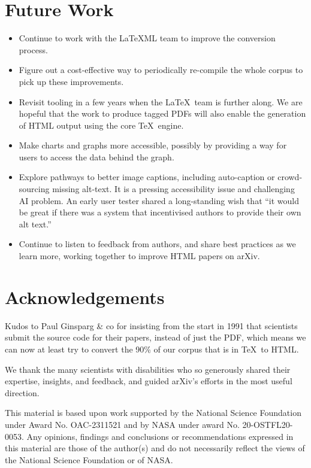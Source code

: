 \documentclass{easychair}
\begin{document}
\section{Future Work}
\label{sect:Future Work}

\begin{itemize}
    \item Continue to work with the LaTeXML team to improve the conversion process.
    \item Figure out a cost-effective way to periodically re-compile the whole corpus to pick up these improvements.
    \item Revisit tooling in a few years when the \LaTeX\ team is further along. We are hopeful that the work to produce tagged PDFs will also enable the generation of HTML output using the core \TeX\ engine.
    \item Make charts and graphs more accessible, possibly by providing a way for users to access the data behind the graph.
    \item Explore pathways to better image captions, including auto-caption or crowd-sourcing missing alt-text. It is a pressing accessibility issue and challenging AI problem. An early user tester shared a long-standing wish that ``it would be great if there was a system that incentivised authors to provide their own alt text.''
    \item Continue to listen to feedback from authors, and share best practices as we learn more, working together to improve HTML papers on arXiv.
\end{itemize}

\section{Acknowledgements}
\label{sect:Acknowledgements}

Kudos to Paul Ginsparg \& co for insisting from the start in 1991 that scientists submit the source code for their papers, instead of just the PDF, which means we can now at least try to convert the 90\% of our corpus that is in \TeX\ to HTML.

We thank the many scientists with disabilities who so generously shared their expertise, insights, and feedback, and guided arXiv's efforts in the most useful direction.

This material is based upon work supported by the National Science Foundation under Award No. OAC-2311521 and by NASA under award No. 20-OSTFL20-0053. Any opinions, findings and conclusions or recommendations expressed in this material are those of the author(s) and do not necessarily reflect the views of the National Science Foundation or of NASA.


\printbibliography %


\end{document}
